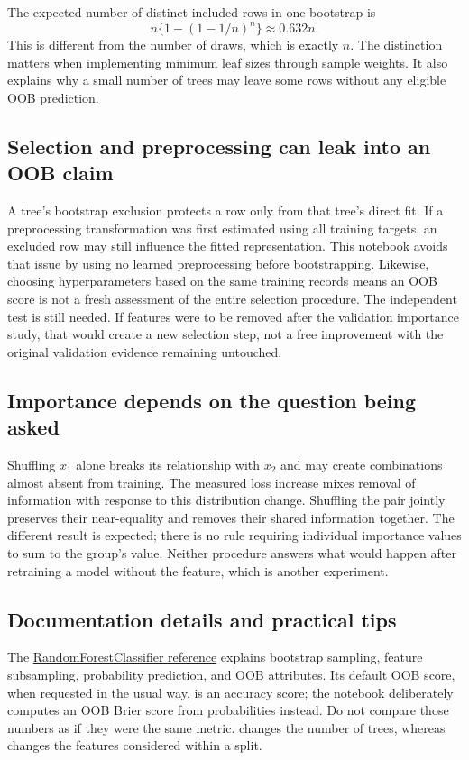 The expected number of distinct included rows in one bootstrap is
\[n\{1-(1-1/n)^n\}\approx0.632n.\]
This is different from the number of draws, which is exactly $n$. The distinction matters when implementing
minimum leaf sizes through sample weights. It also explains why a small number of trees may leave some rows
without any eligible OOB prediction.

\subsection*{Selection and preprocessing can leak into an OOB claim}
A tree's bootstrap exclusion protects a row only from that tree's direct fit. If a preprocessing transformation
was first estimated using all training targets, an excluded row may still influence the fitted representation.
This notebook avoids that issue by using no learned preprocessing before bootstrapping.
Likewise, choosing hyperparameters based on the same training records means an OOB score is not a fresh
assessment of the entire selection procedure. The independent test is still needed.
If features were to be removed after the validation importance study, that would create a new selection step,
not a free improvement with the original validation evidence remaining untouched.

\subsection*{Importance depends on the question being asked}
Shuffling $x_1$ alone breaks its relationship with $x_2$ and may create combinations almost absent from training.
The measured loss increase mixes removal of information with response to this distribution change.
Shuffling the pair jointly preserves their near-equality and removes their shared information together.
The different result is expected; there is no rule requiring individual importance values to sum to the group's value.
Neither procedure answers what would happen after retraining a model without the feature, which is another experiment.

\newpage
\subsection*{Documentation details and practical tips}
The \href{https://scikit-learn.org/1.8/modules/generated/sklearn.ensemble.RandomForestClassifier.html}{RandomForestClassifier reference}
explains bootstrap sampling, feature subsampling, probability prediction, and OOB attributes.
Its default OOB score, when requested in the usual way, is an accuracy score; the notebook deliberately computes
an OOB Brier score from probabilities instead. Do not compare those numbers as if they were the same metric.
 changes the number of trees, whereas  changes the features considered within a split.

